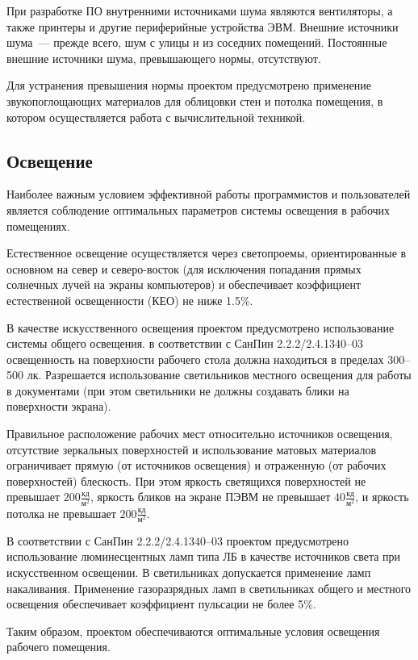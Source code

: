 При разработке ПО внутренними источниками шума являются вентиляторы, а также принтеры и другие периферийные устройства ЭВМ. Внешние источники шума~--- прежде всего, шум с улицы и из соседних помещений. Постоянные внешние источники шума, превышающего нормы, отсутствуют.

Для устранения превышения нормы проектом предусмотрено применение звукопоглощающих материалов для облицовки стен и потолка помещения, в котором осуществляется работа с вычислительной техникой.

\subsection{Освещение}

Наиболее важным условием эффективной работы программистов и пользователей является соблюдение оптимальных параметров системы освещения в рабочих помещениях.

Естественное освещение осуществляется через светопроемы, ориентированные в основном на север и северо-восток (для исключения попадания прямых солнечных лучей на экраны компьютеров) и обеспечивает коэффициент естественной освещенности (КЕО) не ниже 1.5\%.

В качестве искусственного освещения проектом предусмотрено использование системы общего освещения. в соответствии с СанПин 2.2.2/2.4.1340--03 освещенность на поверхности рабочего стола должна находиться в пределах 300--500 лк. Разрешается использование светильников местного освещения для работы в документами (при этом светильники не должны создавать блики на поверхности экрана).

Правильное расположение рабочих мест относительно источников освещения, отсутствие зеркальных поверхностей и использование матовых материалов ограничивает прямую (от источников освещения) и отраженную (от рабочих поверхностей) блескость. При  этом яркость светящихся поверхностей не превышает $200 \frac{\text{кд}}{\text{м}^2}$, яркость бликов на экране ПЭВМ не превышает $40 \frac{\text{кд}}{\text{м}^2}$, и яркость потолка не превышает $200 \frac{\text{кд}}{\text{м}^2}$.

В соответствии с СанПин 2.2.2/2.4.1340--03 проектом предусмотрено использование люминесцентных ламп типа ЛБ в качестве источников света при искусственном освещении. В светильниках допускается применение ламп накаливания. Применение газоразрядных ламп в светильниках общего и местного освещения обеспечивает коэффициент пульсации не более 5\%.

Таким образом, проектом обеспечиваются оптимальные условия освещения рабочего помещения.

